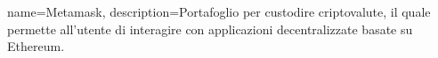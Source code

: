 {
	name={Metamask},
	description={Portafoglio per custodire criptovalute, il quale permette all'utente di interagire con applicazioni decentralizzate basate su Ethereum.}
}
